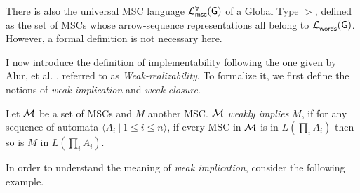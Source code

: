 There is also the universal MSC language $\mathcal{L}_{\mathsf{msc}}^{\forall}(\mathsf{G})$ 
of a Global Type $\gt$, defined as the set of MSCs whose arrow-sequence 
representations all belong to $\mathcal{L}_{\mathsf{words}}^{}(\mathsf{G})$. However, a formal 
definition is not necessary here. 


I now introduce the definition of implementability following the one given 
by Alur, et al. \cite{alur2005realizability}, referred to as 
\textit{Weak-realizability}.
To formalize it, we first define the notions of 
\textit{weak implication} and \textit{weak closure}.


\begin{definition}
	Let $\mathcal{M}$ be a set of MSCs and $M$ another MSC. $\mathcal{M}$
	\textit{weakly implies} $M$, if for any sequence of automata
	$\langle A_i \ |\ 1\leq i\leq n\rangle$, if every MSC in $\mathcal{M}$ is in
	$L(\prod_i A_i)$ then so is $M$ in $L(\prod_i A_i)$.
\end{definition}

In order to understand the meaning of \emph{weak implication},
consider the following example.

